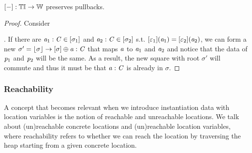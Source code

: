 \begin{lemma}\label{lem:anyL-pls-pres}
    $[-] : {\mathbb{T}\mathbb{I}} \to \mathbb{W}$ preserves pullbacks.
\end{lemma}
\begin{proof}
    Consider 
    .
    If there are $\mathit{a}_1 : \mathit{C} \in [\sigma_1]$ and $\mathit{a}_2 : \mathit{C} \in [\sigma_2]$ s.t. $[\varepsilon_1](\mathit{a}_1) = [\varepsilon_2](\mathit{a}_2)$,
    we can form a new $\sigma' = \lfloor\sigma\rfloor \to {[\sigma] \oplus \mathit{a}: \mathit{C}}$ that maps $\mathit{a}$ to $\mathit{a}_1$ and $\mathit{a}_2$ and notice that the data of $\mathit{p}_1$ and $\mathit{p}_2$ will be the same.
    As a result, the new square with root $\sigma'$ will commute and thus it must be that $\mathit{a} : \mathit{C}$ is already in $\sigma$.
\end{proof}

\subsubsection{Reachability}

A concept that becomes relevant when we introduce instantiation data with location variables is the notion of reachable and unreachable locations.
We talk about (un)reachable concrete locations and (un)reachable location variables, where reachability refers to whether we can reach the location by traversing the heap starting from a given concrete location.

